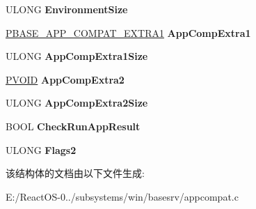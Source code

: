 \begin{DoxyCompactItemize}
\mbox{\label{struct___b_a_s_e___a_p_p___c_o_m_p_a_t___d_a_t_a_a4939bc7d6e3e1a31b6b60cb6c3dd6a16}} 
U\+L\+O\+NG {\bfseries Environment\+Size}
\item 
\mbox{\label{struct___b_a_s_e___a_p_p___c_o_m_p_a_t___d_a_t_a_a7233289de80ca1d823bddc3d89129aa4}} 
\hyperlink{struct___b_a_s_e___a_p_p___c_o_m_p_a_t___e_x_t_r_a1}{P\+B\+A\+S\+E\+\_\+\+A\+P\+P\+\_\+\+C\+O\+M\+P\+A\+T\+\_\+\+E\+X\+T\+R\+A1} {\bfseries App\+Comp\+Extra1}
\item 
\mbox{\label{struct___b_a_s_e___a_p_p___c_o_m_p_a_t___d_a_t_a_aa56245284fa54186bbf7dba7d21cf945}} 
U\+L\+O\+NG {\bfseries App\+Comp\+Extra1\+Size}
\item 
\mbox{\label{struct___b_a_s_e___a_p_p___c_o_m_p_a_t___d_a_t_a_a7a8c1aa3be39d1615ce8dbc622013654}} 
\hyperlink{interfacevoid}{P\+V\+O\+ID} {\bfseries App\+Comp\+Extra2}
\item 
\mbox{\label{struct___b_a_s_e___a_p_p___c_o_m_p_a_t___d_a_t_a_ab141afb7ce53c61e9f6c8752ffea8a2a}} 
U\+L\+O\+NG {\bfseries App\+Comp\+Extra2\+Size}
\item 
\mbox{\label{struct___b_a_s_e___a_p_p___c_o_m_p_a_t___d_a_t_a_a0314b7e1e7f27d05b3e47e6074b283f4}} 
B\+O\+OL {\bfseries Check\+Run\+App\+Result}
\item 
\mbox{\label{struct___b_a_s_e___a_p_p___c_o_m_p_a_t___d_a_t_a_a0f9e00f99b2d1de2be1184bf1b07f585}} 
U\+L\+O\+NG {\bfseries Flags2}
\end{DoxyCompactItemize}


该结构体的文档由以下文件生成\+:\begin{DoxyCompactItemize}
\item 
E\+:/\+React\+O\+S-\/0../subsystems/win/basesrv/appcompat.\+c\end{DoxyCompactItemize}
